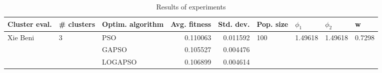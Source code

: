 \begin{table}
\centering
\caption{Results of experiments}
\begin{tabular}{lllrrllll}
\toprule
            Cluster eval. &        \# clusters & Optim. algorithm &  Avg. fitness &  Std. dev. &            Pop. size &               $\phi_{1}$ &               $\phi_{2}$ &                       w \\
\midrule
\multirow{3}{*}{Xie Beni} & \multirow{3}{*}{3} &              PSO &      0.110063 &   0.011592 & \multirow{3}{*}{100} & \multirow{3}{*}{1.49618} & \multirow{3}{*}{1.49618} & \multirow{3}{*}{0.7298} \\
                          &                    &            GAPSO &      0.105527 &   0.004476 &                      &                          &                          &                         \\
                          &                    &          LOGAPSO &      0.106899 &   0.004614 &                      &                          &                          &                         \\
\bottomrule
\end{tabular}
\end{table}

